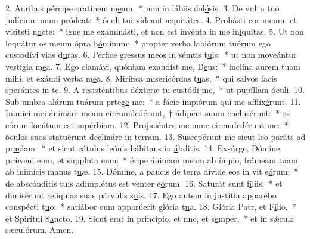 2. Auribus pércipe oratinem m\uline{e}am,~* non in lábiis dol\uline{ó}sis.
3. De vultu tuo judícium mum pr\uline{ó}deat:~* óculi tui vídeant æquit\uline{á}tes.
4. Probásti cor meum, et visitsti n\uline{o}cte:~* igne me examinásti, et non est invénta in me in\uline{í}quitas.
5. Ut non loquátur os meum ópra h\uline{ó}minum:~* propter verba labiórum tuórum ego custodívi vias d\uline{u}ras.
6. Pérfice gressus meos in sémtis t\uline{u}is:~* ut non moveántur vestígia m\uline{e}a.
7. Ego clamávi, quóniam exaudíst me, D\uline{e}us:~* inclína aurem tuam mihi, et exáudi verba m\uline{e}a.
8. Mirífica misericórdas t\uline{u}as,~* qui salvos facis sperántes \uline{i}n te.
9. A resisténtibus déxteræ tu cust\uline{ó}di me,~* ut pupíllam \uline{ó}culi.
10. Sub umbra alárum tuárum prteg\uline{e} me:~* a fácie impiórum qui me afflix\uline{é}runt.
11. Inimíci mei ánimam meam circumdedérunt,~† ádipem suum cnclus\uline{é}runt:~* os eórum locútum est sup\uline{é}rbiam.
12. Projiciéntes me nunc circmded\uline{é}runt me:~* óculos suos statuérunt declináre in t\uline{e}rram.
13. Suscepérunt me sicut leo paráts ad pr\uline{æ}dam:~* et sicut cátulus leónis hábitans in \uline{á}bditis.
14. Exsúrge, Dómine, prǽveni eum, et supplnta \uline{e}um:~* éripe ánimam meam ab ímpio, frámeam tuam ab inimícis manus t\uline{u}æ.
15. Dómine, a paucis de terra dívide eos in vit e\uline{ó}rum:~* de abscónditis tuis adimplétus est venter e\uline{ó}rum.
16. Saturát sunt f\uline{í}liis:~* et dimisérunt relíquias suas párvulis s\uline{u}is.
17. Ego autem in justítia apparébo conspécti t\uline{u}o:~* satiábor cum apparúerit glória t\uline{u}a.
18. Glória Patr, et F\uline{í}lio,~* et Spirítui S\uline{a}ncto.
19. Sicut erat in princípio, et nnc, et s\uline{e}mper,~* et in sǽcula sæculórum. \uline{A}men.
